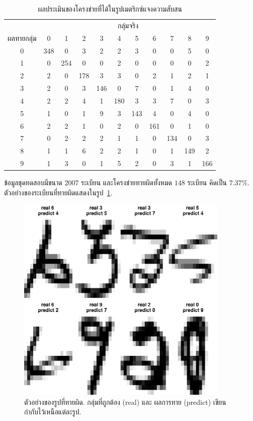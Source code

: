 \begin{table}[hbtp]
\caption{ผลประเมินของโครงข่ายที่ได้ในรูปเมตริกซ์แจงความสับสน}
\label{tbl: ann app zip image confusion matrix}
\begin{center}
\begin{tabular}{|c|c|c|c|c|c|c|c|c|c|c|}
\hline
& \multicolumn{10}{|c|}{กลุ่มจริง} \\
\cline{2-11}
ผลทายกลุ่ม & 0 & 1 & 2 & 3 & 4 & 5 & 6 & 7 & 8 & 9 \\
\hline
0 & 348  & 0  & 3  & 2  & 2  & 3  & 0  & 0  & 5  & 0  \\
\hline
1 & 0  & 254  & 0  & 0  & 2  & 0  & 0  & 0  & 0  & 2  \\
\hline
2 & 2  & 0  & 178  & 3  & 3  & 0  & 2  & 1  & 2  & 1  \\
\hline
3 & 2  & 0  & 3  & 146  & 0  & 7  & 0  & 1  & 4  & 0  \\
\hline
4 & 2  & 2  & 4  & 1  & 180  & 3  & 3  & 7  & 0  & 3  \\
\hline
5 & 1  & 0  & 1  & 9  & 3  & 143  & 4  & 0  & 4  & 0  \\
\hline
6 & 2  & 2  & 1  & 0  & 2  & 0  & 161  & 0  & 1  & 0  \\
\hline
7 & 0  & 2  & 2  & 2  & 1  & 1  & 0  & 134  & 0  & 3  \\
\hline
8 & 1  & 1  & 6  & 2  & 2  & 1  & 0  & 1  & 149  & 2  \\
\hline
9 & 1  & 3  & 0  & 1  & 5  & 2  & 0  & 3  & 1  & 166  \\
\hline
\end{tabular} 
\end{center}
\end{table}

ข้อมูลชุดทดสอบมีขนาด $2007$ ระเบียน 
และโครงข่ายทายผิดทั้งหมด $148$ ระเบียน คิดเป็น $7.37\%$.
ตัวอย่างของระเบียนที่ทายผิดแสดงในรูป~\ref{fig: ann zip wrong classified samples}.

%
\begin{figure}
\begin{center}
\includegraphics[width=4in]{04ANNAppImg/sampleWrongClass.eps}
\end{center}
\caption{ตัวอย่างของรูปที่ทายผิด. กลุ่มที่ถูกต้อง (real) และ ผลการทาย (predict) เขียนกำกับไว้เหนือแต่ละรูป.}
\label{fig: ann zip wrong classified samples}
\end{figure}
%

